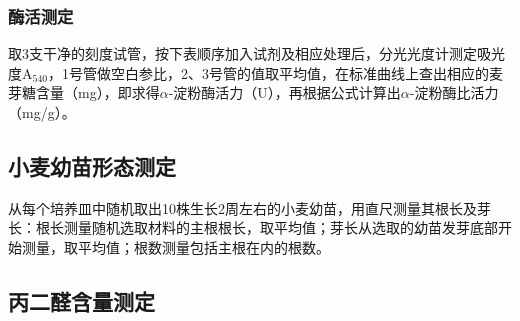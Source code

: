 \documentclass[UTF8]{ctexart}
\begin{document}
    \subsubsection*{酶活测定}
    取3支干净的刻度试管，按下表顺序加入试剂及相应处理后，分光光度计测定吸光度A$_{540}$，1号管做空白参比，2、3号管的值取平均值，在标准曲线上查出相应的麦芽糖含量（mg），即求得$\alpha$-淀粉酶活力（U），再根据公式计算出$\alpha$-淀粉酶比活力（mg/g）。
    \begin{table}[h]
        \centering
        \setlength{\abovecaptionskip}{0.cm}
        \caption{淀粉酶活力测定方法}
    \end{table}


    \subsection{小麦幼苗形态测定}
    从每个培养皿中随机取出10株生长2周左右的小麦幼苗，用直尺测量其根长及芽长：根长测量随机选取材料的主根根长，取平均值；芽长从选取的幼苗发芽底部开始测量，取平均值；根数测量包括主根在内的根数。

    \subsection{丙二醛含量测定}
\end{document}
